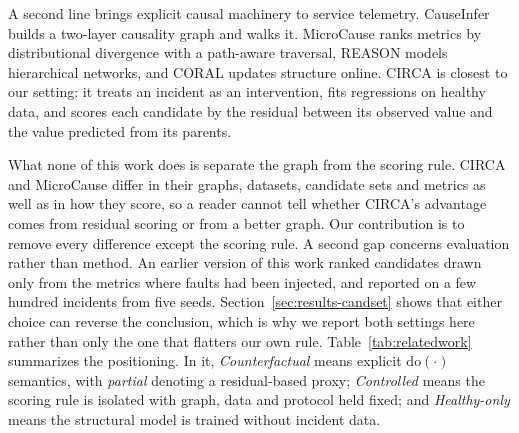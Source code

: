 \documentclass[conference]{IEEEtran}
\begin{document}
A second line brings explicit causal machinery to service telemetry. CauseInfer \cite{chen2014causeinfer} builds a two-layer causality graph and walks it. MicroCause \cite{meng2020microcause} ranks metrics by distributional divergence with a path-aware traversal, REASON \cite{wang2023reason} models hierarchical networks, and CORAL \cite{wang2023coral} updates structure online. CIRCA \cite{li2022circa} is closest to our setting: it treats an incident as an intervention, fits regressions on healthy data, and scores each candidate by the residual between its observed value and the value predicted from its parents.

What none of this work does is separate the graph from the scoring rule. CIRCA and MicroCause differ in their graphs, datasets, candidate sets and metrics as well as in how they score, so a reader cannot tell whether CIRCA's advantage comes from residual scoring or from a better graph. Our contribution is to remove every difference except the scoring rule. A second gap concerns evaluation rather than method. An earlier version of this work ranked candidates drawn only from the metrics where faults had been injected, and reported on a few hundred incidents from five seeds. Section~\ref{sec:results-candset} shows that either choice can reverse the conclusion, which is why we report both settings here rather than only the one that flatters our own rule. Table~\ref{tab:relatedwork} summarizes the positioning. In it, \emph{Counterfactual} means explicit $\mathrm{do}(\cdot)$ semantics, with \emph{partial} denoting a residual-based proxy; \emph{Controlled} means the scoring rule is isolated with graph, data and protocol held fixed; and \emph{Healthy-only} means the structural model is trained without incident data.
\end{document}
